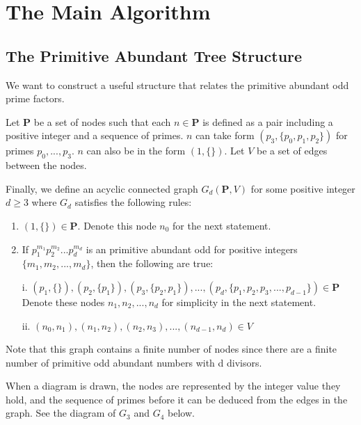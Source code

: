 \documentclass[../paper.tex]{subfiles}
\begin{document}
\section{The Main Algorithm}

\subsection{The Primitive Abundant Tree Structure}

We want to construct a useful structure that relates the primitive
abundant odd prime factors. 

Let $\mathbf{P}$ be a set of nodes such that each $n \in 
\mathbf{P}$ is defined as a pair including a positive integer 
and a sequence of primes. $n$ can take form 
$(p_3, \{p_0, p_1, p_2\})$ for primes $p_0,..., p_3$. 
$n$ can also be in the form $(1, \{\})$. Let $V$ be a set of 
edges between the nodes.

Finally, we define an acyclic connected graph $G_d(\mathbf{P},V)$ 
for some positive integer $d \geq 3$ where $G_d$ satisfies the 
following rules: 

\begin{enumerate}

\item $(1, \{\}) \in \mathbf{P}$. Denote this node $n_0$ for the next 
      statement.

\item If $p_1^{m_1}p_2^{m_2}...p_d^{m_d}$ is an primitive abundant 
      odd for positive integers $\{m_1, m_2, ..., m_d\}$, then
			the following are true: 

      i. $ (p_1, \{\}), (p_2, \{p_1\}), (p_3, \{p_2, p_1\}), ..., 
        (p_d, \{p_1, p_2, p_3, ..., p_{d-1}\}) \in \mathbf{P} $
			Denote these nodes $n_1, n_2, ..., n_d$ for simplicity in the 
			next statement.

      ii. $ (n_0, n_1), (n_1, n_2), (n_2, n_3), ..., (n_{d-1}, n_{d}) 
      \in V $

\end{enumerate}

Note that this graph contains a finite number of nodes since 
there are a finite number of primitive odd abundant numbers with
d divisors. 

When a diagram is drawn, the nodes are represented by the integer 
value they hold, and the sequence of primes before it can be deduced
from the edges in the graph. See the diagram of $G_3$ and $G_4$
below.
\end{document}
